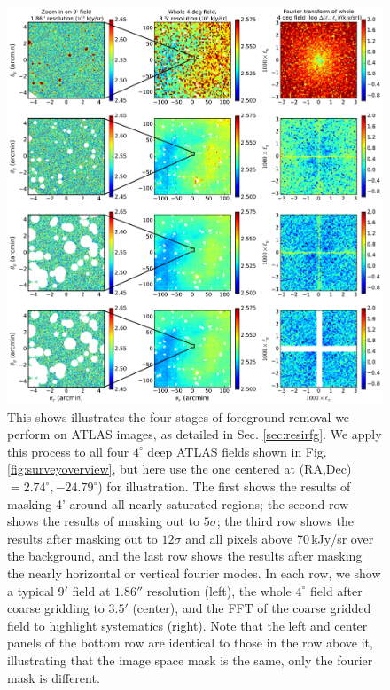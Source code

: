 \documentclass{emulateapj}
\begin{document}
\begin{figure}[h]
\centering
\includegraphics[width=7in]{images/big_foreground_masking_study_2_magoffset=20_56+0_274.pdf}
\caption{This shows illustrates the four stages of foreground removal we perform on ATLAS images, as detailed in Sec. \ref{sec:resirfg}. We apply this process to all four $4^\circ$ deep ATLAS fields shown in Fig. \ref{fig:surveyoverview}, but here use the one centered at (RA,Dec)$=2.74^\circ, -24.79^\circ$) for illustration. The first shows the results of masking 4' around all nearly saturated regions; the second row shows the results of masking out to $5\sigma$; the third row shows the results after masking out to $12\sigma$ and all pixels above 70\,kJy/sr over the background, and the last row shows the results after masking the nearly horizontal or vertical fourier modes. In each row, we show a typical $9'$ field at $1.86''$ resolution (left), the whole $4^\circ$ field after coarse gridding to $3.5'$ (center), and the FFT of the coarse gridded field to highlight systematics (right). Note that the left and center panels of the bottom row are identical to those in the row above it, illustrating that the image space mask is the same, only the fourier mask is different.}
\label{fig:bigfgmaskingstudy}
\end{figure}
\end{document}
